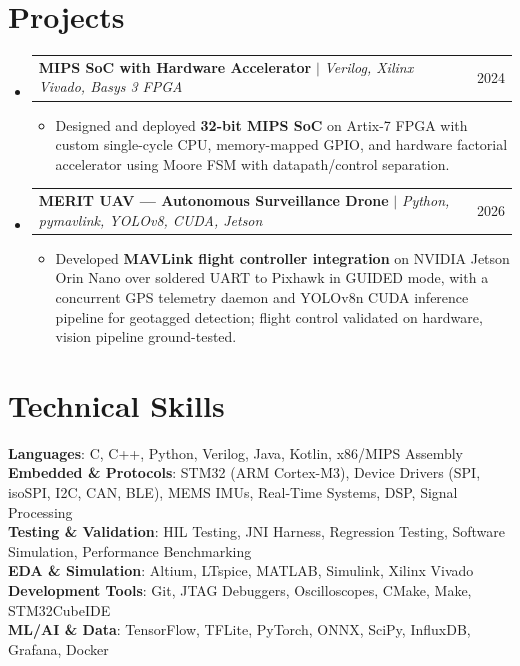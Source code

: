 \documentclass[letterpaper,11pt]{article}
\makeatletter
\newcommand{\resumeItem}[1]{
  \item\small{
    {#1 \vspace{-2pt}}
  }
}
\newcommand{\resumeProjectHeading}[2]{
    \item
    \begin{tabular*}{0.97\textwidth}{l@{\extracolsep{\fill}}r}
      \small#1 & #2 \\
    \end{tabular*}\vspace{-7pt}
}
\newcommand{\resumeSubHeadingListStart}{\begin{itemize}[leftmargin=0.15in, label={}]}
\newcommand{\resumeSubHeadingListEnd}{\end{itemize}}
\newcommand{\resumeItemListStart}{\begin{itemize}}
\newcommand{\resumeItemListEnd}{\end{itemize}\vspace{-5pt}}
\makeatother
\begin{document}
\section{Projects}
    \resumeSubHeadingListStart
 
      \resumeProjectHeading
          {\textbf{MIPS SoC with Hardware Accelerator} $|$ \emph{Verilog, Xilinx Vivado, Basys 3 FPGA}}{2024}
          \resumeItemListStart
            \resumeItem{Designed and deployed \textbf{32-bit MIPS SoC} on Artix-7 FPGA with custom single-cycle CPU, memory-mapped GPIO, and hardware factorial accelerator using Moore FSM with datapath/control separation.}
            
          \resumeItemListEnd
 
      \resumeProjectHeading
          {\textbf{MERIT UAV --- Autonomous Surveillance Drone} $|$ \emph{Python, pymavlink, YOLOv8, CUDA, Jetson}}{2026}
          \resumeItemListStart
            \resumeItem{Developed \textbf{MAVLink flight controller integration} on NVIDIA Jetson Orin Nano over soldered UART to Pixhawk in GUIDED mode, with a concurrent GPS telemetry daemon and YOLOv8n CUDA inference pipeline for geotagged detection; flight control validated on hardware, vision pipeline ground-tested.}
            
          \resumeItemListEnd 
 
    \resumeSubHeadingListEnd
 
\section{Technical Skills}
 \begin{itemize}[leftmargin=0.15in, label={}]
    \small{\item{
     \textbf{Languages}{: C, C++, Python, Verilog, Java, Kotlin, x86/MIPS Assembly} \\
     \textbf{Embedded \& Protocols}{: STM32 (ARM Cortex-M3), Device Drivers (SPI, isoSPI, I2C, CAN, BLE), MEMS IMUs, Real-Time Systems, DSP, Signal Processing} \\
     \textbf{Testing \& Validation}{: HIL Testing, JNI Harness, Regression Testing, Software Simulation, Performance Benchmarking} \\
     \textbf{EDA \& Simulation}{: Altium, LTspice, MATLAB, Simulink, Xilinx Vivado} \\
     \textbf{Development Tools}{: Git, JTAG Debuggers, Oscilloscopes, CMake, Make, STM32CubeIDE} \\
     \textbf{ML/AI \& Data}{: TensorFlow, TFLite, PyTorch, ONNX, SciPy, InfluxDB, Grafana, Docker}
    }}
 \end{itemize}
 
\end{document}
